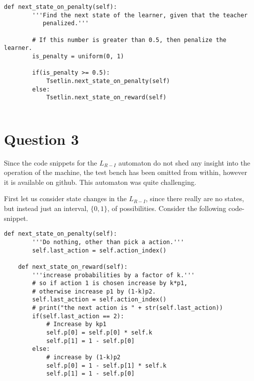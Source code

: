 \documentclass[10pt,english]{article}
\begin{document}
\clearpage
\begin{lstlisting}[label={list:first},caption=Krylov core code.] 
def next_state_on_penalty(self):
        '''Find the next state of the learner, given that the teacher
           penalized.'''

        # If this number is greater than 0.5, then penalize the learner.
        is_penalty = uniform(0, 1)

        if(is_penalty >= 0.5):
            Tsetlin.next_state_on_penalty(self)
        else:
            Tsetlin.next_state_on_reward(self)
   
\end{lstlisting}

\section{Question 3}
Since the code snippets for the $L_{R-I}$ automaton do not shed any insight into the operation of the machine, the test bench has been omitted from within, however it is available on github.  This automaton was quite challenging. 

First let us consider state changes in the $L_{R-I}$, since there really are no states, but instead just an interval, $\lbrace0, 1\rbrace$, of possibilities.  Consider the following code-snippet.

\begin{lstlisting}[label={list:first},caption=State Translation in the $L_{R-I}$  automaton.] 
 def next_state_on_penalty(self):
        '''Do nothing, other than pick a action.'''
        self.last_action = self.action_index()

    def next_state_on_reward(self):
        '''increase probabilities by a factor of k.'''
        # so if action 1 is chosen increase by k*p1,
        # otherwise increase p1 by (1-k)p2.
        self.last_action = self.action_index()
        # print("the next action is " + str(self.last_action))
        if(self.last_action == 2):
            # Increase by kp1
            self.p[0] = self.p[0] * self.k
            self.p[1] = 1 - self.p[0]
        else:
            # increase by (1-k)p2
            self.p[0] = 1 - self.p[1] * self.k
            self.p[1] = 1 - self.p[0]   
\end{lstlisting}
\end{document}
